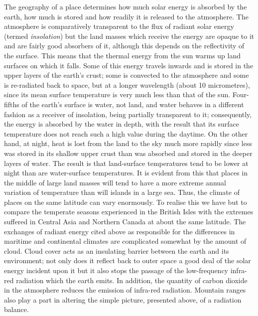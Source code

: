 The geography of a place determines how much solar energy is absorbed by the earth,
how much is stored and how readily it is released to the atmosphere. The atmosphere is
comparatively transparent to the flux of radiant solar energy (termed \emph{insolation\/}) but the
land masses which receive the energy are opaque to it and are fairly good absorbers of it,
although this depends on the reflectivity of the surface. This means that the thermal energy
from the sun warms up land surfaces on which it falls. Some of this energy travels inwards
and is stored in the upper layers of the earth's crust; some is convected to the atmosphere
and some is re-radiated back to space, but at a longer wavelength (about 10 micrometres),
since its mean surface temperature is very much less than that of the sun. Four-fifths of the
earth's surface is water, not land, and water behaves in a different fashion as a receiver of
insolation, being partially transparent to it; consequently, the energy is absorbed by the
water in depth, with the result that its surface temperature does not reach such a high value
during the daytime. On the other hand, at night, heat is lost from the land to the sky much
more rapidly since less was stored in its shallow upper crust than was absorbed and stored
in the deeper layers of water. The result is that land-surface temperatures tend to be lower
at night than are water-surface temperatures. It is evident from this that places in the
middle of large land masses will tend to have a more extreme annual variation of temperature
than will islands in a large sea. Thus, the climate of places on the same latitude can vary
enormously. To realise this we have but to compare the temperate seasons experienced in
the British Isles with the extremes suffered in Central Asia and Northern Canada at about
the same latitude. The exchanges of radiant energy cited above as responsible for the
differences in maritime and continental climates are complicated somewhat by the amount
of cloud. Cloud cover acts as an insulating barrier between the earth and its environment;
not only does it reflect back to outer space a good deal of the solar energy incident upon
it but it also stops the passage of the low-frequency infra-red radiation which the earth
emits. In addition, the quantity of carbon dioxide in the atmosphere reduces the emission
of infra-red radiation. Mountain ranges also play a part in altering the simple picture,
presented above, of a radiation balance.


